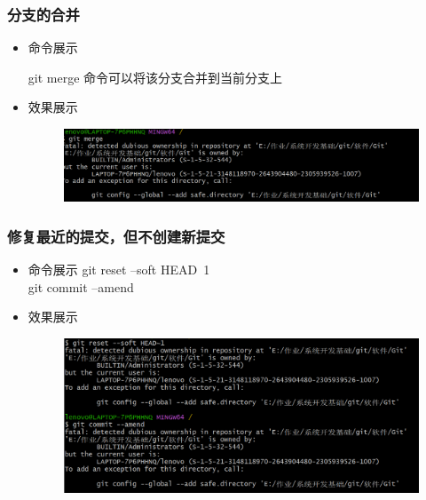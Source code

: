 \documentclass[UTF8]{ctexart}
\begin{document}
\subsubsection{分支的合并}
\begin{itemize}
  \item 命令展示
 
     git merge 命令可以将该分支合并到当前分支上
\item 效果展示
 \begin{figure}[H]
\includegraphics[width=1\textwidth]{5}
\end{figure}
\end{itemize}
\subsubsection{修复最近的提交，但不创建新提交}
\begin{itemize}
  \item 命令展示
 git reset --soft HEAD~1\\
git commit --amend
\item 效果展示
  \begin{figure}[H]
\includegraphics[width=1\textwidth]{6}
\end{figure}
\end{itemize}
\end{document}
